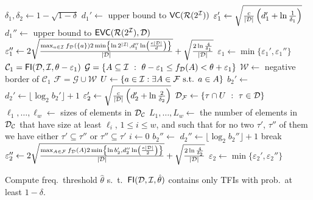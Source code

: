 \begin{algorithm}[htbp]
   \DontPrintSemicolon
  $\delta_1,\delta_2\leftarrow 1-\sqrt{1-\delta}$ 
  $d_1'\leftarrow$ upper bound to $\mathsf{VC}(\mathcal{R}(2^{\cal I}))$ 
  $\varepsilon_1' \leftarrow \sqrt{\frac{c}{|{\cal D}|}\left(d_1' + \ln\frac{1}{\delta_1}\right)}$\;
  $d_1''\leftarrow$ upper bound to $\mathsf{EVC}(\mathcal{R}(2^{\cal I}),{\cal D})$ 
  $\varepsilon_1'' \leftarrow
  2\sqrt{\frac{\max_{a\in{\cal I}}f_{\cal D}(\{a\})2\min\left\{\ln2^{|{\cal I}|},d_1''\ln\left(\frac{e|{\cal D}|}{d}\right)\right\}}{|{\cal D}|}}+\sqrt{\frac{2\ln\frac{4}{\delta_1}}{|{\cal D}|}}$\;
  $\varepsilon_1\leftarrow\min\{\varepsilon_1',\varepsilon_1''\}$\;
  $\mathcal{C}_1=\mathsf{FI}({\cal D},{\cal I},\theta-\varepsilon_1)$\;
  $\mathcal{G}=\{A\subseteq{\cal I} ~:~ \theta-\varepsilon_1\le
f_{\cal D}(A)<\theta+\varepsilon_1\}$\;
  $\mathcal{W}\leftarrow$ negative border of $\mathcal{C}_1$\;
  $\mathcal{F}=\mathcal{G}\cup\mathcal{W}$\;
  $U\leftarrow\{a\in{\cal I} : \exists A\in\mathcal{F} \mbox{ s.t. } a\in A\}$\;
  $b_2'\leftarrow$ \;
  $d_2'\leftarrow\lfloor\log_2b_2'\rfloor+1$\;
  $\varepsilon_2' \leftarrow \sqrt{\frac{c}{|{\cal D}|}\left(d_2' + \ln\frac{2}{\delta_2}\right)}$\;
  ${\cal D}_\mathcal{F}\leftarrow \{\tau \cap U ~:~ \tau\in{\cal D}\}$\;
  $\ell_1,\dotsc,\ell_w\leftarrow$ sizes of elements in ${\cal D}_\mathcal{C}$ 
  $L_1,\dotsc,L_w\leftarrow$ the number of elements in ${\cal D}_\mathcal{C}$ that
  have size at least $\ell_i$, $1\le i\le w$, and such that for no two $\tau'$,
  $\tau''$ of them we have either $\tau'\subseteq\tau''$ or
  $\tau''\subseteq\tau'$\;
  $i\leftarrow 0$\;
  {
  $b_2''\leftarrow$ \;
  $d_2''\leftarrow\lfloor\log_2b_2''\rfloor+1$\;
  {
  break\;
  }
  }
  $\varepsilon_2'' \leftarrow
  2\sqrt{\frac{\max_{A\in\mathcal{F}}f_{\cal D}(A)2\min\left\{\ln
	b_2',d_2''\ln\left(\frac{e|{\cal D}|}{2}\right)\right\}}{|{\cal D}|}}+\sqrt{\frac{2\ln\frac{4}{\delta_2}}{|{\cal D}|}}$\;
  $\varepsilon_2\leftarrow\min\{\varepsilon_2',\varepsilon_2''\}$\;
  \caption{Compute freq.~threshold $\hat{\theta}$
  s.~t.~$\mathsf{FI}({\cal D},{\cal I},\hat{\theta})$ contains only TFIs with prob.~at least
  $1-\delta$.}
  \label{alg:vcfull}
\end{algorithm}

